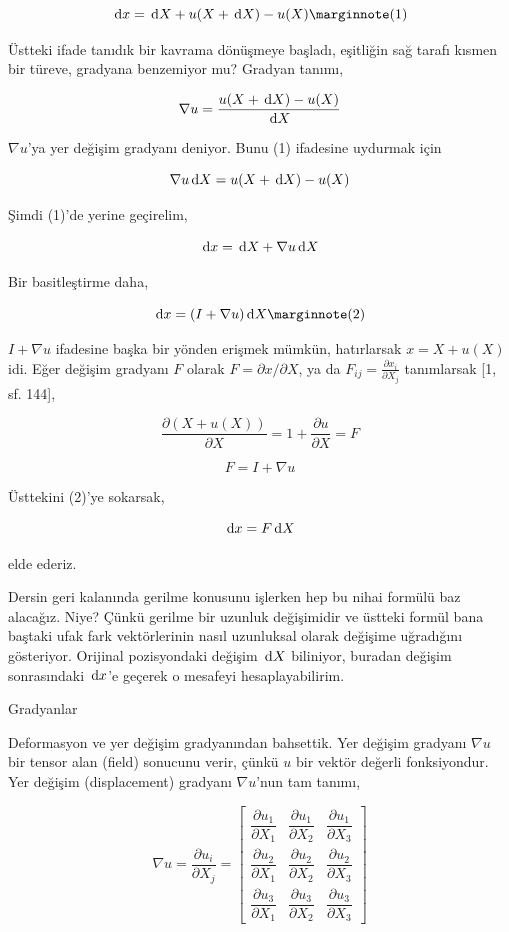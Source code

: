 \documentclass[12pt,fleqn]{article}\usepackage{../../common}
\begin{document}
$$
\ud x = \ud X + u(X+\ud X) - u(X)
\mlabel{1}
$$

Üstteki ifade tanıdık bir kavrama dönüşmeye başladı, eşitliğin sağ tarafı kısmen
bir türeve, gradyana benzemiyor mu? Gradyan tanımı,

$$
\nabla u = \frac{u(X+\,\mathrm{d} X) - u(X)}{\,\mathrm{d} X}
$$

$\nabla u$'ya yer değişim gradyanı deniyor.  Bunu (1) ifadesine uydurmak için 

$$
\nabla u \,\mathrm{d} X = u(X+\,\mathrm{d} X) - u(X)
$$


Şimdi (1)'de yerine geçirelim,

$$
\,\mathrm{d} x = \,\mathrm{d} X + \nabla u \,\mathrm{d} X
$$

Bir basitleştirme daha,

$$
\ud x = (I + \nabla u) \ud X
\mlabel{2}
$$

$I + \nabla u$ ifadesine başka bir yönden erişmek mümkün, hatırlarsak
$x = X + u(X)$ idi. Eğer değişim gradyanı $F$ olarak $F = \partial x / \partial X$,
ya da $F_{ij} = \frac{\partial x_i}{\partial X_j}$ tanımlarsak [1, sf. 144], 

$$
\frac{\partial (X + u(X))}{\partial X} = 1  + \frac{\partial u}{\partial X} = F
$$

$$
F = I + \nabla u
$$

Üsttekini (2)'ye sokarsak,

$$
\,\mathrm{d} x = F \,\mathrm{d} X
$$

elde ederiz.

Dersin geri kalanında gerilme konusunu işlerken hep bu nihai formülü baz
alacağız. Niye?  Çünkü gerilme bir uzunluk değişimidir ve üstteki formül bana
baştaki ufak fark vektörlerinin nasıl uzunluksal olarak değişime uğradığını
gösteriyor. Orijinal pozisyondaki değişim $\,\mathrm{d} X$ biliniyor, buradan değişim
sonrasındaki $\,\mathrm{d} x$'e geçerek o mesafeyi hesaplayabilirim.

Gradyanlar

Deformasyon ve yer değişim gradyanından bahsettik. Yer değişim gradyanı $\nabla
u$ bir tensor alan (field) sonucunu verir, çünkü $u$ bir vektör değerli
fonksiyondur. Yer değişim (displacement) gradyanı $\nabla u$'nun tam tanımı,

$$
\renewcommand*{\arraystretch}{2.5}
\nabla u = \frac{\partial u_i}{\partial X_j} =
\left[\begin{array}{ccc}
\dfrac{\partial u_1}{\partial X_1} & \dfrac{\partial u_1}{\partial X_2} & \dfrac{\partial u_1}{\partial X_3} \\
\dfrac{\partial u_2}{\partial X_1} & \dfrac{\partial u_2}{\partial X_2} & \dfrac{\partial u_2}{\partial X_3} \\
\dfrac{\partial u_3}{\partial X_1} & \dfrac{\partial u_3}{\partial X_2} & \dfrac{\partial u_3}{\partial X_3} 
\end{array}\right]
$$
\end{document}
